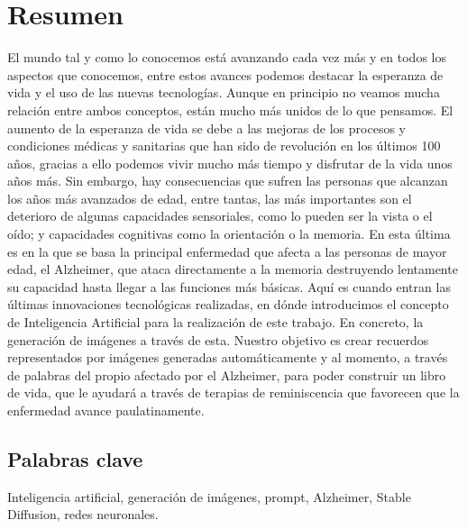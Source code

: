 \chapter*{Resumen}

El mundo tal y como lo conocemos está avanzando cada vez más y en todos los aspectos que conocemos, entre estos avances podemos destacar la esperanza de vida y el uso de las nuevas tecnologías. Aunque en principio no veamos mucha relación entre ambos conceptos, están mucho más unidos de lo que pensamos. El aumento de la esperanza de vida se debe a las mejoras de los procesos y condiciones médicas y sanitarias que han sido de revolución en los últimos 100 años, gracias a ello podemos vivir mucho más tiempo y disfrutar de la vida unos años más. Sin embargo, hay consecuencias que sufren las personas que alcanzan los años más avanzados de edad, entre tantas, las más importantes son el deterioro de algunas capacidades sensoriales, como lo pueden ser la vista o el oído; y capacidades cognitivas como la orientación o la memoria. En esta última es en la que se basa la principal enfermedad que afecta a las personas de mayor edad, el Alzheimer, que ataca directamente a la memoria destruyendo lentamente su capacidad hasta llegar a las funciones más básicas. Aquí es cuando entran las últimas innovaciones tecnológicas realizadas, en dónde introducimos el concepto de Inteligencia Artificial para la realización de este trabajo. En concreto, la generación de imágenes a través de esta. Nuestro objetivo es crear recuerdos representados por imágenes generadas automáticamente y al momento, a través de palabras del propio afectado por el Alzheimer, para poder construir un libro de vida, que le ayudará a través de terapias de reminiscencia que favorecen que la enfermedad avance paulatinamente. 


\section*{Palabras clave}
   
\noindent Inteligencia artificial, generación de imágenes, prompt, Alzheimer, Stable Diffusion, redes neuronales.

   


